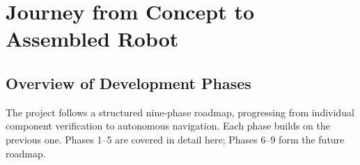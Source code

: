 \documentclass[12pt, a4paper]{article}
\begin{document}
\section{Journey from Concept to Assembled Robot}

\subsection{Overview of Development Phases}

The project follows a structured nine-phase roadmap, progressing from individual
component verification to autonomous navigation. Each phase builds on the
previous one. Phases 1--5 are covered in detail here; Phases 6--9 form the
future roadmap.
\end{document}
